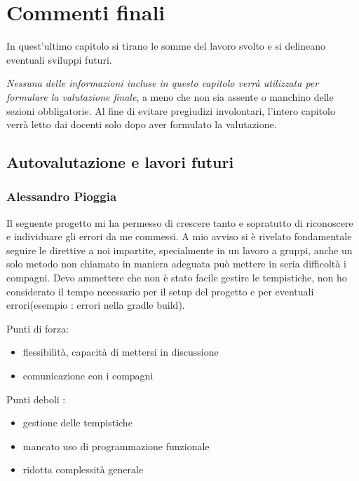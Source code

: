 
\chapter{Commenti finali}

In quest'ultimo capitolo si tirano le somme del lavoro svolto e si delineano eventuali sviluppi
futuri.

\textit{Nessuna delle informazioni incluse in questo capitolo verrà utilizzata per formulare la valutazione finale}, a meno che non sia assente o manchino delle sezioni obbligatorie.
%
Al fine di evitare pregiudizi involontari, l'intero capitolo verrà letto dai docenti solo dopo aver formulato la valutazione.

\section{Autovalutazione e lavori futuri}

\subsection*{Alessandro Pioggia}

Il seguente progetto mi ha permesso di crescere tanto e sopratutto di riconoscere e individuare gli errori da me commessi.
A mio avviso si è rivelato fondamentale seguire le direttive a noi impartite, specialmente in un lavoro a gruppi, anche un solo metodo non chiamato in maniera adeguata può mettere in seria difficoltà i compagni.
Devo ammettere che non è stato facile gestire le tempistiche, non ho considerato il tempo necessario per il setup del progetto e per eventuali errori(esempio : errori nella gradle build).
\\

\begin{flushleft}
	Punti di forza:
\end{flushleft}

\begin{itemize}
	\item flessibilità, capacità di mettersi in discussione
	\item comunicazione con i compagni
\end{itemize}

\begin{flushleft}
	Punti deboli :
\end{flushleft}

\begin{itemize}
	\item gestione delle tempistiche
	\item mancato uso di programmazione funzionale
	\item ridotta complessità generale
\end{itemize}

